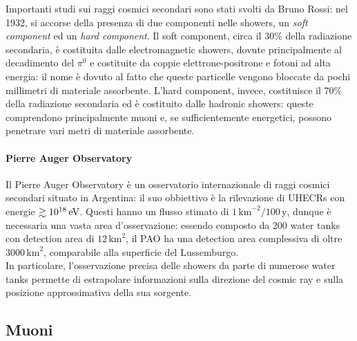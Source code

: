 Importanti studi sui raggi cosmici secondari sono stati svolti da Bruno Rossi: nel 1932, si accorse della presenza di due componenti nelle showers, un \textit{soft component} ed un \textit{hard component}. Il soft component, circa il 30\% della radiazione secondaria, è costituita dalle electromagnetic showers, dovute principalmente al decadimento del $ \pi^0 $ e costituite da coppie elettrone-positrone e fotoni ad alta energia: il nome è dovuto al fatto che queste particelle vengono bloccate da pochi millimetri di materiale assorbente. L'hard component, invece, costituisce il 70\% della radiazione secondaria ed è costituito dalle hadronic showers: queste comprendono principalmente muoni e, se sufficientemente energetici, possono penetrare vari metri di materiale assorbente.

\paragraph{Pierre Auger Observatory}

Il Pierre Auger Observatory è un osservatorio internazionale di raggi cosmici secondari situato in Argentina: il suo obbiettivo è la rilevazione di UHECRs con energie $ \gtrsim 10^{18}\,\mathrm{eV} $. Questi hanno un flusso stimato di $ 1\,\text{km}^{-2} / 100\,\text{y} $, dunque è necessaria una vasta area d'osservazione: essendo composto da 200 water tanks con detection area di $ 12\,\text{km}^2 $, il PAO ha una detection area complessiva di oltre $ 3000\,\text{km}^2 $, comparabile alla superficie del Lussemburgo.\\
In particolare, l'osservazione precisa delle showers da parte di numerose water tanks permette di estrapolare informazioni sulla direzione del cosmic ray e sulla posizione approssimativa della sua sorgente.

\subsection{Muoni}

